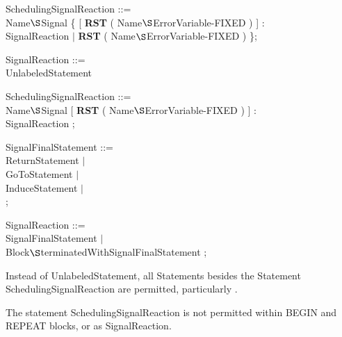 \begin{removed}
SchedulingSignalReaction ::=\\
 Name$\S $Signal \{ [ {\bf RST} ( Name$\S $ErrorVariable-FIXED ) ] :\\
\x \x SignalReaction $\mid$ {\bf RST} ( Name$\S $ErrorVariable-FIXED ) \};

SignalReaction ::=\\
\x UnlabeledStatement
\end{removed}
\begin{front}
\begin{added}
SchedulingSignalReaction ::=\\
 Name$\S $Signal [ {\bf RST} ( Name$\S $ErrorVariable-FIXED ) ] :\\
\x \x SignalReaction ;

SignalFinalStatement ::= \\
\x ReturnStatement $\mid$ \\
\x GoToStatement $\mid$ \\
\x InduceStatement $\mid$ \\
 ;

SignalReaction ::=\\
\x SignalFinalStatement $\mid$ \\
\x Block$\S $terminatedWithSignalFinalStatement ;
\end{added}
\end{front}
\begin{grammar}






\end{grammar}

Instead of UnlabeledStatement, all Statements besides the
Statement SchedulingSignalReaction are permitted, particularly
.

The statement SchedulingSignalReaction is not permitted within BEGIN
and REPEAT blocks, or as SignalReaction.

